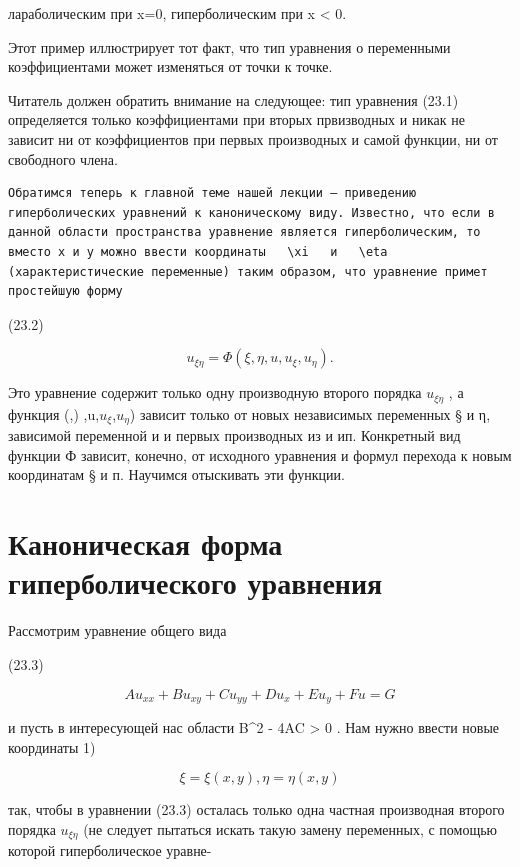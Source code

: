 \documentclass[
  ukrainian,
]{article}
\begin{document}
лараболическим при x=0, гиперболическим при x \textless{} 0.

Этот пример иллюстрирует тот факт, что тип уравнения о переменными
коэффициентами может изменяться от точки к точке.

Читатель должен обратить внимание на следующее: тип уравнения (23.1)
определяется только коэффициентами при вторых првизводных и никак не
зависит ни от коэффициентов при первых производных и самой функции, ни
от свободного члена.

\begin{verbatim}
Обратимся теперь к главной теме нашей лекции — приведению гиперболических уравнений к каноническому виду. Известно, что если в данной области пространства уравнение является гиперболическим, то вместо x и y можно ввести координаты   \xi   и   \eta  (характеристические переменные) таким образом, что уравнение примет простейшую форму
\end{verbatim}

(23.2)

\[
u_{\xi\eta} = \Phi(\xi, \eta, u, u_{\xi}, u_{\eta}).
\]

Это уравнение содержит только одну производную второго порядка
\(u_{\xi\eta}\) , а функция \Phi(\xi,) \eta,u,\(u_{\xi}\),\(u_{\eta}\))
зависит только от новых независимых переменных § и η, зависимой
переменной и и первых производных из и ип. Конкретный вид функции Ф
зависит, конечно, от исходного уравнения и формул перехода к новым
координатам § и п. Научимся отыскивать эти функции.

\section{Каноническая форма гиперболического
уравнения}\label{ux43aux430ux43dux43eux43dux438ux447ux435ux441ux43aux430ux44f-ux444ux43eux440ux43cux430-ux433ux438ux43fux435ux440ux431ux43eux43bux438ux447ux435ux441ux43aux43eux433ux43e-ux443ux440ux430ux432ux43dux435ux43dux438ux44f}

Рассмотрим уравнение общего вида

(23.3)

\[
Au_{xx} + Bu_{xy} + Cu_{yy} + Du_x + Eu_y + Fu = G
\]

и пусть в интересующей нас области B\^{}2 - 4AC \textgreater{} 0 . Нам
нужно ввести новые координаты 1)

\[
\xi = \xi(x, y),
\eta = \eta(x, y)
\]

так, чтобы в уравнении (23.3) осталась только одна частная производная
второго порядка \(u_{\xi\eta}\) (не следует пытаться искать такую замену
переменных, с помощью которой гиперболическое уравне-
\end{document}
